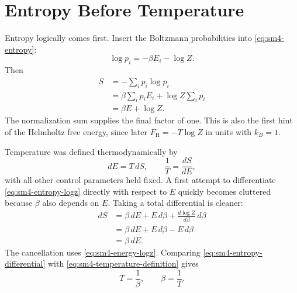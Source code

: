 \section{Entropy Before Temperature}

Entropy logically comes first.  Insert the Boltzmann probabilities into
\eqref{eq:sm4-entropy}:
\begin{equation}
 \log p_i=-\beta E_i-\log Z.
\end{equation}
Then
\begin{align}
 S
 &=-\sum_i p_i\log p_i\\
 &=\beta\sum_i p_iE_i+\log Z\sum_i p_i\\
 &=\beta E+\log Z.
 \label{eq:sm4-entropy-logz}
\end{align}
The normalization sum supplies the final factor of one.  This is also the
first hint of the Helmholtz free energy, since later
\(F_{\mathrm H}=-T\log Z\) in units with \(k_B=1\).

\begin{classroomqa}
\end{classroomqa}

\begin{classroomqa}
\end{classroomqa}

Temperature was defined thermodynamically by
\begin{equation}
 dE=T\,dS,
 \qquad
 \frac{1}{T}=\frac{dS}{dE},
 \label{eq:sm4-temperature-definition}
\end{equation}
with all other control parameters held fixed.  A first attempt to
differentiate \eqref{eq:sm4-entropy-logz} directly with respect to \(E\)
quickly becomes cluttered because \(\beta\) also depends on \(E\).  Taking
a total differential is cleaner:
\begin{align}
 dS
 &=\beta\,dE+E\,d\beta
   +\frac{d\log Z}{d\beta}\,d\beta\\
 &=\beta\,dE+E\,d\beta-E\,d\beta\\
 &=\beta\,dE.
 \label{eq:sm4-entropy-differential}
\end{align}
The cancellation uses \eqref{eq:sm4-energy-logz}.  Comparing
\eqref{eq:sm4-entropy-differential} with
\eqref{eq:sm4-temperature-definition} gives
\begin{equation}
 T=\frac{1}{\beta},
 \qquad
 \beta=\frac{1}{T}.
 \label{eq:sm4-beta-temperature}
\end{equation}

